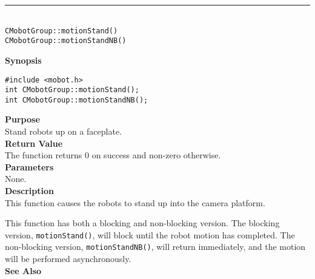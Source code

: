 \noindent
\vspace{5pt}
\rule{4.5in}{0.015in}\\
\noindent
{\LARGE \texttt{CMobotGroup::motionStand()}}\\
{\LARGE \texttt{CMobotGroup::motionStandNB()}}\\
{}

\noindent
{\bf Synopsis}
\begin{verbatim}
#include <mobot.h>
int CMobotGroup::motionStand();
int CMobotGroup::motionStandNB();
\end{verbatim}

\noindent
{\bf Purpose}\\
Stand robots up on a faceplate.\\

\noindent
{\bf Return Value}\\
The function returns 0 on success and non-zero otherwise.\\

\noindent
{\bf Parameters}\\
None.\\

\noindent
{\bf Description}\\
This function causes the robots to stand up into the camera platform.

This function has both a blocking and non-blocking version.
The blocking version, \texttt{motionStand()}, will block until the
robot motion has completed. The non-blocking version, \texttt{motionStandNB()},
will return immediately, and the motion will be performed asynchronously.\\

\noindent
{\bf See Also}\\

